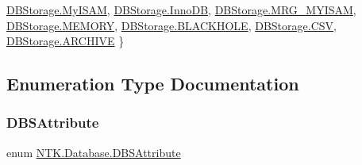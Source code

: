 \begin{DoxyCompactItemize}
\mbox{\hyperlink{namespace_n_t_k_1_1_database_a230f8759823fea002bc464f7f8df6abfa011b1aa482b4b1778b96d1c5e6f485b5}{D\+B\+Storage.\+My\+I\+S\+AM}}, 
\mbox{\hyperlink{namespace_n_t_k_1_1_database_a230f8759823fea002bc464f7f8df6abfa819198c5eb3660413dd452a9d961f8dc}{D\+B\+Storage.\+Inno\+DB}}, 
\mbox{\hyperlink{namespace_n_t_k_1_1_database_a230f8759823fea002bc464f7f8df6abfae9778d2b233d21719d931dc037ef14d7}{D\+B\+Storage.\+M\+R\+G\+\_\+\+M\+Y\+I\+S\+AM}}, 
\mbox{\hyperlink{namespace_n_t_k_1_1_database_a230f8759823fea002bc464f7f8df6abfa7014705458ee3cf0192f6aa52cfddea5}{D\+B\+Storage.\+M\+E\+M\+O\+RY}}, 
\newline
\mbox{\hyperlink{namespace_n_t_k_1_1_database_a230f8759823fea002bc464f7f8df6abfa281681f7ddb92f288b0057b3f740f5e7}{D\+B\+Storage.\+B\+L\+A\+C\+K\+H\+O\+LE}}, 
\mbox{\hyperlink{namespace_n_t_k_1_1_database_a230f8759823fea002bc464f7f8df6abfacc8d68c551c4a9a6d5313e07de4deafd}{D\+B\+Storage.\+C\+SV}}, 
\mbox{\hyperlink{namespace_n_t_k_1_1_database_a230f8759823fea002bc464f7f8df6abfa71f01f32e90440fd6039511dde69e995}{D\+B\+Storage.\+A\+R\+C\+H\+I\+VE}}
 \}
\end{DoxyCompactItemize}


\subsection{Enumeration Type Documentation}
\mbox{\label{namespace_n_t_k_1_1_database_a6f1256a7ce685347c809145604636ee4}} 
\subsubsection{\texorpdfstring{DBSAttribute}{DBSAttribute}}
{\footnotesize\ttfamily enum \mbox{\hyperlink{namespace_n_t_k_1_1_database_a6f1256a7ce685347c809145604636ee4}{N\+T\+K.\+Database.\+D\+B\+S\+Attribute}}\hspace{0.3cm}{\ttfamily [strong]}}

